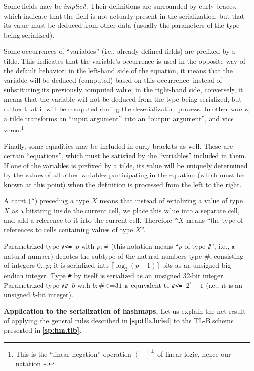 \documentclass[12pt,oneside]{article}
\def\makepoint#1{\medbreak\noindent{\bf #1.\ }}
\def\nxsubpoint{\refstepcounter{subsubsection}%
    \smallbreak\makepoint{\thesubsubsection}}
\def\refpoint#1{{\rm\textbf{\ref{#1}}}}
\let\ptref=\refpoint
\def\emb#1{\textbf{#1.}}
\def\caret{\^{}}
\begin{document}
Some fields may be {\em implicit}. Their definitions are surrounded by curly braces, which indicate that the field is not actually present in the serialization, but that its value must be deduced from other data (usually the parameters of the type being serialized).

Some occurrences of ``variables'' (i.e., already-defined fields) are prefixed by a tilde. This indicates that the variable's occurrence is used in the opposite way of the default behavior: in the left-hand side of the equation, it means that the variable will be deduced (computed) based on this occurrence, instead of substituting its previously computed value; in the right-hand side, conversely, it means that the variable will not be deduced from the type being serialized, but rather that it will be computed during the deserialization process. In other words, a tilde transforms an ``input argument'' into an ``output argument'', and vice versa.\footnote{This is the ``linear negation'' operation $(-)^\perp$ of linear logic, hence our notation \texttt{\~}.}

Finally, some equalities may be included in curly brackets as well. These are certain ``equations'', which must be satisfied by the ``variables'' included in them. If one of the variables is prefixed by a tilde, its value will be uniquely determined by the values of all other variables participating in the equation (which must be known at this point) when the definition is processed from the left to the right.

A caret (\texttt{\caret}) preceding a type $X$ means that instead of serializing a value of type $X$ as a bitstring inside the current cell, we place this value into a separate cell, and add a reference to it into the current cell. Therefore \texttt{\caret$X$} means ``the type of references to cells containing values of type $X$''.

Parametrized type \texttt{\#<= $p$} with $p:\texttt{\#}$ (this notation means ``$p$ of type \texttt{\#}'', i.e., a natural number) denotes the subtype of the natural numbers type $\#$, consisting of integers $0\ldots p$; it is serialized into $\lceil\log_2(p+1)\rceil$ bits as an unsigned big-endian integer. Type \texttt{\#} by itself is serialized as an unsigned 32-bit integer. Parametrized type \texttt{\#\# $b$} with $b:\texttt{\#<=}31$ is equivalent to \texttt{\#<= $2^b-1$} (i.e., it is an unsigned $b$-bit integer).

\nxsubpoint\emb{Application to the serialization of hashmaps} Let us explain the net result of applying the general rules described in \ptref{sp:tlb.brief} to the TL-B scheme presented in \ptref{sp:hm.tlb}.
\end{document}
